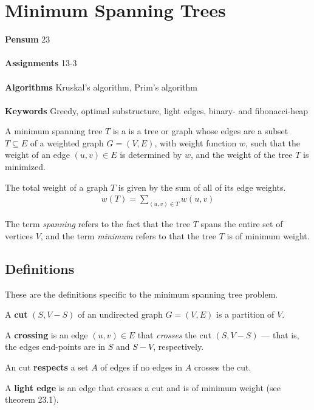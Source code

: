 
\chapter{Minimum Spanning Trees}
\label{ch:minimumspanningtrees}

\textbf{Pensum} 23 \cite{clrs} \\\\
\textbf{Assignments} 13-3 \\\\
\textbf{Algorithms} Kruskal's algorithm, Prim's algorithm \\\\
\textbf{Keywords} Greedy, optimal substructure, light edges,
binary- and fibonacci-heap
\vspace{1in}

\noindent A minimum spanning tree $T$ is a is a tree or graph whose edges are
a subset $T \subseteq E$ of a weighted graph $G = (V, E)$, with weight
function $w$, such that the weight of an edge $(u, v) \in E$ is determined by
$w$, and the weight of the tree $T$ is minimized.

The total weight of a graph $T$ is given by the sum of all of its edge weights.
\begin{align}
	w(T) = \sum_{(u, v) \in T}w(u, v)
\end{align}

The term \textit{spanning} refers to the fact that the tree $T$ spans the
entire set of vertices $V$, and the term \textit{minimum} refers to that the
tree $T$ is of minimum weight.
\section{Definitions}
These are the definitions specific to the minimum spanning tree problem.
\begin{description}
	\item A \textbf{cut} $(S, V-S)$ of an undirected graph $G = (V, E)$ is a
partition of $V$.
	\item A \textbf{crossing} is an edge $(u, v) \in E$ that \textit{crosses}
the cut $(S, V - S)$ --- that is, the edges end-points are in $S$ and $S - V$,
respectively.
	\item An cut \textbf{respects} a set $A$ of edges if no edges in $A$
crosses the cut.
	\item A \textbf{light edge} is an edge that crosses a cut and is of
minimum weight (see theorem 23.1\cite[p. 626]{clrs}).
\end{description}

